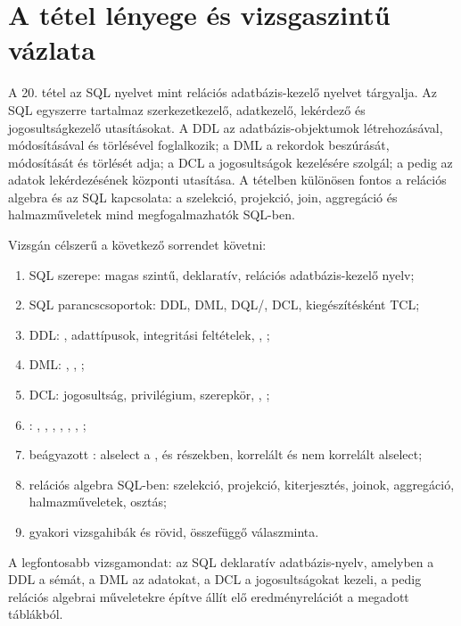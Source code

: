 \section{A tétel lényege és vizsgaszintű vázlata}

\begin{summarybox}
A 20. tétel az SQL nyelvet mint relációs adatbázis-kezelő nyelvet tárgyalja. Az SQL egyszerre tartalmaz szerkezetkezelő, adatkezelő, lekérdező és jogosultságkezelő utasításokat. A DDL az adatbázis-objektumok létrehozásával, módosításával és törlésével foglalkozik; a DML a rekordok beszúrását, módosítását és törlését adja; a DCL a jogosultságok kezelésére szolgál; a  pedig az adatok lekérdezésének központi utasítása. A tételben különösen fontos a relációs algebra és az SQL kapcsolata: a szelekció, projekció, join, aggregáció és halmazműveletek mind megfogalmazhatók SQL-ben.
\end{summarybox}

Vizsgán célszerű a következő sorrendet követni:

\begin{enumerate}
  \item SQL szerepe: magas szintű, deklaratív, relációs adatbázis-kezelő nyelv;
  \item SQL parancscsoportok: DDL, DML, DQL/, DCL, kiegészítésként TCL;
  \item DDL: , adattípusok, integritási feltételek, , ;
  \item DML: , , ;
  \item DCL: jogosultság, privilégium, szerepkör, , ;
  \item {}: , , , , , , ;
  \item beágyazott : alselect a ,  és  részekben, korrelált és nem korrelált alselect;
  \item relációs algebra SQL-ben: szelekció, projekció, kiterjesztés, joinok, aggregáció, halmazműveletek, osztás;
  \item gyakori vizsgahibák és rövid, összefüggő válaszminta.
\end{enumerate}

A legfontosabb vizsgamondat: az SQL deklaratív adatbázis-nyelv, amelyben a DDL a sémát, a DML az adatokat, a DCL a jogosultságokat kezeli, a  pedig relációs algebrai műveletekre építve állít elő eredményrelációt a megadott táblákból.


